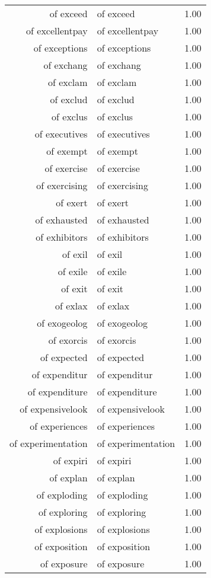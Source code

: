 \begin{table}[ht]
\begin{tabular}{rlr}
  of exceed & of exceed & 1.00 \\ 
  of excellentpay & of excellentpay & 1.00 \\ 
  of exceptions & of exceptions & 1.00 \\ 
  of exchang & of exchang & 1.00 \\ 
  of exclam & of exclam & 1.00 \\ 
  of exclud & of exclud & 1.00 \\ 
  of exclus & of exclus & 1.00 \\ 
  of executives & of executives & 1.00 \\ 
  of exempt & of exempt & 1.00 \\ 
  of exercise & of exercise & 1.00 \\ 
  of exercising & of exercising & 1.00 \\ 
  of exert & of exert & 1.00 \\ 
  of exhausted & of exhausted & 1.00 \\ 
  of exhibitors & of exhibitors & 1.00 \\ 
  of exil & of exil & 1.00 \\ 
  of exile & of exile & 1.00 \\ 
  of exit & of exit & 1.00 \\ 
  of exlax & of exlax & 1.00 \\ 
  of exogeolog & of exogeolog & 1.00 \\ 
  of exorcis & of exorcis & 1.00 \\ 
  of expected & of expected & 1.00 \\ 
  of expenditur & of expenditur & 1.00 \\ 
  of expenditure & of expenditure & 1.00 \\ 
  of expensivelook & of expensivelook & 1.00 \\ 
  of experiences & of experiences & 1.00 \\ 
  of experimentation & of experimentation & 1.00 \\ 
  of expiri & of expiri & 1.00 \\ 
  of explan & of explan & 1.00 \\ 
  of exploding & of exploding & 1.00 \\ 
  of exploring & of exploring & 1.00 \\ 
  of explosions & of explosions & 1.00 \\ 
  of exposition & of exposition & 1.00 \\ 
  of exposure & of exposure & 1.00 \\ 

\end{tabular}
\end{table}
